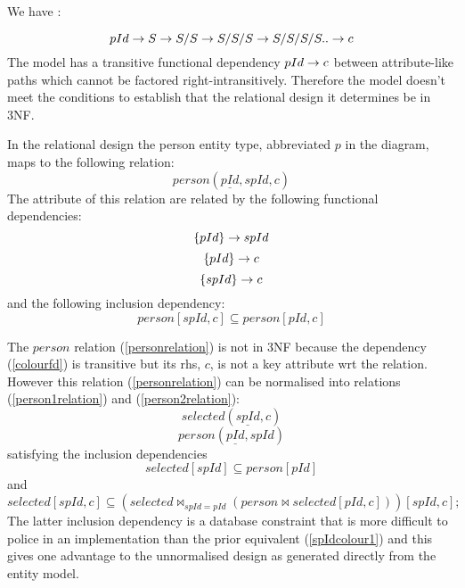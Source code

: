We have :

\begin{equation}
pId \rightarrow S \rightarrow S/S \rightarrow S/S/S \rightarrow S/S/S/S .. \rightarrow c
\end{equation}
The model has a transitive functional dependency $pId \rightarrow c$ between
attribute-like paths which cannot be factored right-intransitively. Therefore the model doesn't meet
the conditions to establish that the relational design it determines  be
in 3NF.

In the relational design the person entity type, abbreviated $p$ in the diagram, maps to the following relation:
\begin{equation}
\label{personrelation}
person(\underline{pId}, spId, c)
\end{equation}
The  attribute of this relation are related by the following  functional dependencies:
\begin{equation}
\left\{pId\right\} \rightarrow spId
\end{equation}
\begin{equation}
\label{colourfd}
\left\{pId\right\} \rightarrow c
\end{equation}
\begin{equation}
\left\{spId\right\} \rightarrow c
\end{equation}
and the following  inclusion dependency:
\begin{equation}
\label{spIdcolour1}
person[spId,c] \subseteq person[pId,c]
\end{equation}

The $person$ relation (\ref{personrelation}) is not in 3NF because the dependency (\ref{colourfd}) is transitive but its rhs, $c$, is not a key attribute wrt the relation. However this
relation (\ref{personrelation}) can be normalised into relations (\ref{person1relation}) and (\ref{person2relation}):
\begin{equation}
\label{person1relation}
selected(\underline{spId},  c)
\end{equation}
\begin{equation}
\label{person2relation}
person(\underline{pId}, spId)
\end{equation}
satisfying the inclusion dependencies
\begin{equation}
selected[spId] \subseteq person[pId]
\end{equation}
and
\begin{equation}
\label{spIdcolour}
selected[spId,c] \subseteq (selected \bowtie_{spId=pId} 
                                       (person \bowtie selected [pId,c]) )
																			[spId,c];
\end{equation}
The latter inclusion dependency is a database constraint that
is more difficult to police in an implementation
than the prior equivalent (\ref{spIdcolour1}) and
this gives one advantage to the unnormalised design as generated
directly from the entity model. 

